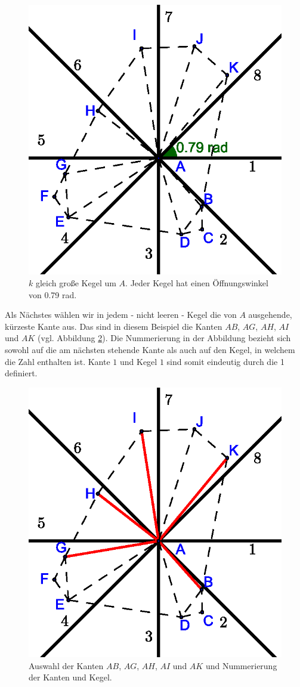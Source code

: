 \documentclass[a4paper,twoside]{IEEEtran}
\begin{document}
\begin{figure}[h!]
\centering
\includegraphics[width=0.7\linewidth]{cones.eps}
\caption{$k $ gleich große Kegel um $A $. Jeder Kegel hat einen Öffnungswinkel von 0.79 rad.}
\label{fig:cones}
\end{figure}

Als Nächstes wählen wir in jedem - nicht leeren - Kegel die von $A $ ausgehende, kürzeste Kante aus.
Das sind in diesem Beispiel die Kanten $AB $, $AG $, $AH $, $AI $ und $AK $ (vgl. Abbildung \ref{fig:shortestedge}). 
Die Nummerierung in der Abbildung bezieht sich sowohl auf die am nächsten stehende Kante als auch auf den Kegel, in welchem die Zahl enthalten ist.
Kante $1 $ und Kegel $1 $ sind somit eindeutig durch die 1 definiert.

\begin{figure}[h!]
\centering
\includegraphics[width=0.7\linewidth]{shortest_edge.eps}
\caption{Auswahl der Kanten $AB $, $AG $, $AH $, $AI $ und $AK $ und Nummerierung der Kanten und Kegel.}
\label{fig:shortestedge}
\end{figure}
\end{document}
